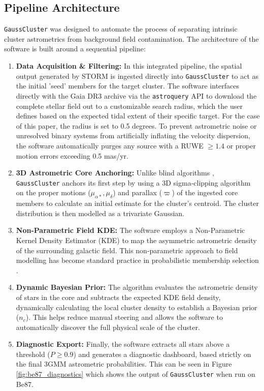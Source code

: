 \documentclass{CU_IOPStyle_PXT999}
\begin{document}
\subsection{Pipeline Architecture}
\label{ssec:3.1}
\texttt{GaussCluster} was designed to automate the process of separating intrinsic cluster astrometrics from background field contamination. The architecture of the software is built around a sequential pipeline:

\begin{enumerate}
    \item \textbf{Data Acquisition \& Filtering:} In this integrated pipeline, the spatial output generated by STORM \cite{storm2026} is ingested directly into \texttt{GaussCluster} \cite{gausscluster2026} to act as the initial 'seed' members for the target cluster. The software interfaces directly with the Gaia DR3 archive via the \texttt{astroquery} API \cite{ginsburg_astroquery_2019} to download the complete stellar field out to a customizable search radius, which the user defines based on the expected tidal extent of their specific target. For the case of this paper, the radius is set to 0.5 degrees. To prevent astrometric noise or unresolved binary systems from artificially inflating the velocity dispersion, the software automatically purges any source with a RUWE $\ge 1.4$ \cite{lindegren_2018} or proper motion errors exceeding 0.5 mas/yr.
    
    \item \textbf{3D Astrometric Core Anchoring:} Unlike blind algorithms \cite{storm2026}, \texttt{GaussCluster} anchors its first step by using a 3D sigma-clipping algorithm on the proper motions ($\mu_{\alpha*}, \mu_{\delta}$) and parallax ($\varpi$) of the ingested core members to calculate an initial estimate for the cluster's centroid. The cluster distribution is then modelled as a trivariate Gaussian.
      
    \item \textbf{Non-Parametric Field KDE:} The software employs a Non-Parametric Kernel Density Estimator (KDE) to map the asymmetric astrometric density of the surrounding galactic field. This non-parametric approach to field modelling has become standard practice in probabilistic membership selection \cite{krone-martins_upmask_2014}.
    
    \item \textbf{Dynamic Bayesian Prior:} The algorithm evaluates the astrometric density of stars in the core and subtracts the expected KDE field density, dynamically calculating the local cluster density to establish a Bayesian prior ($n_c$). This helps reduce manual steering and allows the software to automatically discover the full physical scale of the cluster.
    
    \item \textbf{Diagnostic Export:} Finally, the software extracts all stars above a threshold ($P \ge 0.9$) and generates a diagnostic dashboard, based strictly on the final 3GMM astrometric probabilities. This can be seen in Figure \ref{fig:be87_diagnostics} which shows the output of \texttt{GaussCluster} when run on Be87.
\end{enumerate}
\end{document}
